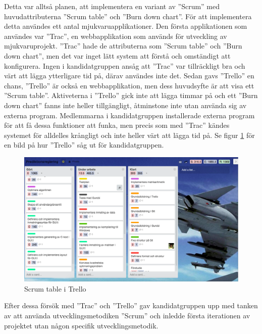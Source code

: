 \newline
\newline
Detta var alltså planen, att implementera en variant av ''Scrum'' med huvudattributerna ''Scrum table'' och ''Burn down chart''. För att implementera detta användes ett antal mjukvaruapplikationer. Den första applikationen som användes var ''Trac'', en webbapplikation som används för utveckling av mjukvaruprojekt. ''Trac'' hade de attributerna som ''Scrum table'' och ''Burn down chart'', men det var  inget lätt system att förstå och omständigt att konfigurera. Ingen i kandidatgruppen ansåg att ''Trac'' var tillräckligt bra och värt att lägga ytterligare tid på, därav användes inte det. Sedan gavs ''Trello'' en chans, ''Trello'' är också en webbapplikation, men dess huvudsyfte är att visa ett ''Scrum table''. Aktiveterna i ''Trello'' gick inte att lägga timmar på och ett ''Burn down chart'' fanns inte heller tillgängligt, åtminstone inte utan använda sig av externa program. Medlemmarna i kandidatgruppen installerade externa program för att få dessa funktioner att funka, men precis som med ''Trac'' kändes systemet för alldelles krångligt och inte heller värt att lägga tid på. Se figur \ref{fig:trello} för en bild på hur ''Trello'' såg ut för kandidatgruppen.

\begin{figure}[h]
\centerline{\includegraphics[scale=0.3]{grafik/trello}}
\caption{Scrum table i Trello}
\label{fig:trello}
\end{figure}

\noindent Efter dessa försök med ''Trac'' och ''Trello'' gav kandidatgruppen upp med tanken av att använda utvecklingsmetodiken ''Scrum'' och inledde första iterationen av projektet utan någon specifik utvecklingsmetodik.

